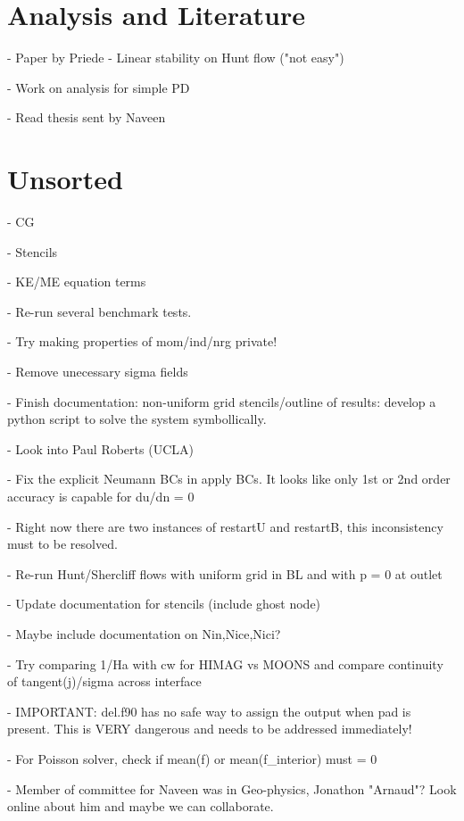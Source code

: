 \documentclass[11pt]{article}
\begin{document}
\section{Analysis and Literature}
- Paper by Priede - Linear stability on Hunt flow ("not easy")

- Work on analysis for simple PD

- Read thesis sent by Naveen

\section{Unsorted}

- CG

- Stencils

- KE/ME equation terms

- Re-run several benchmark tests.

- Try making properties of mom/ind/nrg private!

- Remove unecessary sigma fields

- Finish documentation: non-uniform grid stencils/outline of results: develop a python script to solve the system symbollically.

- Look into Paul Roberts (UCLA)

- Fix the explicit Neumann BCs in apply BCs. It looks like only 1st or 2nd order accuracy is capable for du/dn = 0

- Right now there are two instances of restartU and restartB, this inconsistency must to be resolved.

- Re-run Hunt/Shercliff flows with uniform grid in BL and with p = 0 at outlet

- Update documentation for stencils (include ghost node)

- Maybe include documentation on Nin,Nice,Nici?

- Try comparing 1/Ha with cw for HIMAG vs MOONS and compare continuity of tangent(j)/sigma across interface

- IMPORTANT: del.f90 has no safe way to assign the output when pad is present. This is VERY dangerous and needs to be addressed immediately!

- For Poisson solver, check if mean(f) or mean(f\_interior) must = 0

- Member of committee for Naveen was in Geo-physics, Jonathon "Arnaud"? Look online about him and maybe we can collaborate.
\end{document}
